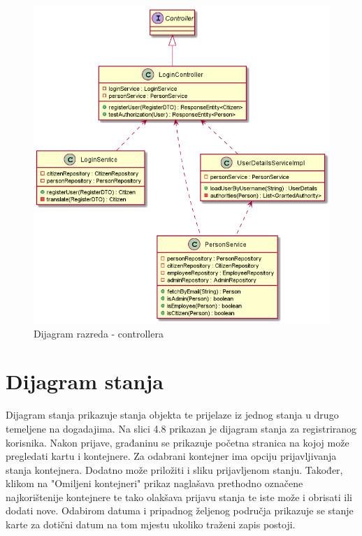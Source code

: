 			\begin{figure}[H]
				\includegraphics[scale=0.7]{figures/ControllerClassDiagram.PNG}
				\centering
				\caption{Dijagram razreda - controllera}
				\label{fig:controller-cd}
			\end{figure}
			
			\eject
		
		\section{Dijagram stanja}
		
		Dijagram stanja prikazuje stanja objekta te prijelaze iz jednog stanja u drugo temeljene na dogadajima. Na slici 4.8 prikazan je dijagram stanja za registriranog
korisnika. Nakon prijave, građaninu se prikazuje početna stranica na kojoj može pregledati kartu i kontejnere. Za odabrani kontejner ima opciju prijavljivanja stanja kontejnera. Dodatno može priložiti i sliku prijavljenom stanju. Također, klikom na "Omiljeni kontejneri" prikaz naglašava prethodno označene najkorištenije kontejnere te tako olakšava prijavu stanja te iste može i obrisati ili dodati nove. Odabirom datuma i pripadnog željenog područja prikazuje se stanje karte za dotični datum na tom mjestu ukoliko traženi zapis postoji.
			
